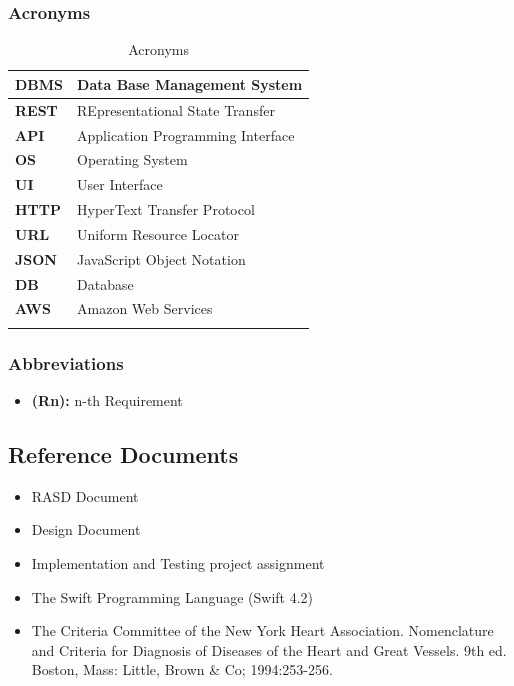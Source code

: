\documentclass[titlepage]{article}
\begin{document}
	\subsubsection{Acronyms}
	\renewcommand*{\arraystretch}{1.4}
	\begin{longtable}{| p{2 cm} | p{7 cm} |} \hline
		{\bf DBMS} & Data Base Management System \\ \hline
		{\bf REST} & REpresentational State Transfer \\ \hline
		{\bf API} & Application Programming Interface \\ \hline
		{\bf OS} & Operating System\\ \hline
		{\bf UI} & User Interface \\ \hline
		{\bf HTTP} & HyperText Transfer Protocol \\ \hline	
		{\bf URL} & Uniform Resource Locator \\ \hline
		{\bf JSON} & JavaScript Object Notation \\ \hline
		{\bf DB} & Database \\ \hline
		{\bf AWS} & Amazon Web Services \\ \hline
		\caption{Acronyms}	
		
	\end{longtable}
	\subsubsection{Abbreviations}
	
	\begin{itemize}
		\item {\bf (Rn):} n-th Requirement
	\end{itemize}
	
	\subsection{Reference Documents}
	\begin{itemize}
		\item {RASD Document}
		\item {Design Document}
		\item {Implementation and Testing project assignment}
		\item {The Swift Programming Language (Swift 4.2)}
		\item {The Criteria Committee of the New York Heart Association. Nomenclature and Criteria for Diagnosis of Diseases of the Heart and Great Vessels. 9th ed. Boston, Mass: Little, Brown \& Co; 1994:253-256.}
	\end{itemize}
	
\end{document}

